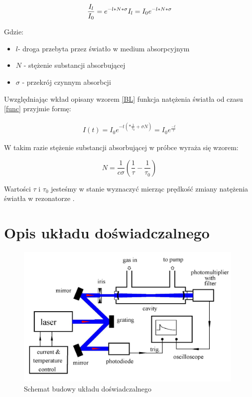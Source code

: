 \documentclass[10pt,a4paper]{article}
\begin{document}
\begin{equation}
    \label{BL}
    \frac{I_l}{I_0}= e^{-l*N*\sigma}\\
    I_l = I_0 e^{-l*N*\sigma}
\end{equation}

Gdzie:
\begin{itemize}
    \item $l$- droga przebyta przez światło w medium absorpcyjnym
    \item $N$ - stężenie substancji absorbującej
    \item $\sigma$ - przekrój czynnym absorbcji
\end{itemize}

Uwzględniając wkład opisany wzorem \ref{BL} funkcja natężenia światła od czasu \ref{func} przyjmie formę: 

\begin{gather}
    \label{funccorr}
    I(t) = I_0 e^{-t \left(*\frac{1}{\tau_0} +\sigma N \right)} = I_0 e^{\frac{-t}{\tau}}
\end{gather}


W takim razie stężenie substancji absorbującej w próbce wyraża się wzorem:

\begin{equation}
    \label{stęż}
    N = \frac{1}{c \sigma}\left( \frac{1}{\tau} - \frac{1}{\tau_0} \right)
\end{equation}

Wartości $\tau$ i $\tau_0$ jesteśmy w stanie wyznaczyć mierząc prędkość zmiany natężenia światła  w rezonatorze \cite{sswo}.

\newpage

\section{Opis układu doświadczalnego}

\begin{figure}[h]
    \centering
    \includegraphics[width=11cm]{pictures/uklad.jpg}
    \caption{Schemat budowy układu doświadczalnego \cite{sswo}}
    \label{schem}
\end{figure}
\end{document}
